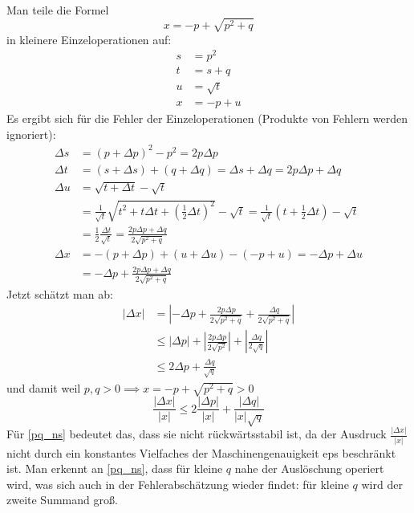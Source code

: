 \documentclass{mywork}
\begin{document}
\begin{aufgabe}
	\\Man teile die Formel
	\begin{equation}
		\label{pq_ns}
		x=-p+\sqrt{p^2+q}
	\end{equation} 
	in kleinere Einzeloperationen auf:
	\begin{align*}
		s&=p^2\\
		t&=s +q\\
		u&=\sqrt{t}\\
		x&=-p+u
	\end{align*}
	Es ergibt sich für die Fehler der Einzeloperationen (Produkte von Fehlern werden ignoriert):
	\begin{align*}
		\Delta s&=(p+\Delta p)^2-p^2=2p\Delta p\\
		\Delta t&=(s +\Delta s) + (q +\Delta q) = \Delta s + \Delta q = 2p\Delta p + \Delta q\\
		\Delta u&=\sqrt{t+\Delta t}-\sqrt{t}\\
			    &=\frac 1{\sqrt{t}}\sqrt{t^2+t\Delta t+\left(\frac 12\Delta t\right)^2}-\sqrt{t}
				 =\frac 1{\sqrt{t}}\left(t+\frac 12\Delta t\right)-\sqrt{t}\\
		   &=\frac 12\frac{\Delta t}{\sqrt{t}}
				 =\frac {2p\Delta p+\Delta q}{2\sqrt{p^2+q}}\\
		\Delta x&=-(p+\Delta p)+(u+\Delta u)-(-p+u)
				 =-\Delta p +\Delta u\\
				 &=-\Delta p +\frac {2p\Delta p+\Delta q}{2\sqrt{p^2+q}}
	\end{align*}
	Jetzt schätzt man ab:
	\begin{align*}
		|\Delta x|&=\left|-\Delta p+ \frac {2p\Delta p}{2\sqrt{p^2+q}}+\frac{\Delta q}{2\sqrt{p^2+q}}\right|\\
				   &\le |\Delta p|+\left|\frac{2p\Delta p}{2\sqrt{p^2}}\right|+\left|\frac{\Delta q}{2\sqrt{q}}\right|\\
				   &\le 2\Delta p + \frac {\Delta q}{\sqrt q}
	\end{align*}
	und damit weil $p,q>0 \implies x=-p+\sqrt{p^2+q}>0$
	\[
		\frac{|\Delta x|}{|x|}\le2\frac{|\Delta p|}{|x|}+\frac{|\Delta q|}{|x|\sqrt{q}}
	\]
	Für \eqref{pq_ns} bedeutet das, dass sie nicht rückwärtsstabil ist, da der Ausdruck
	$\frac {|\Delta x|}{|x|}$ nicht durch ein konstantes Vielfaches der Maschinengenauigkeit eps beschränkt ist.
	Man erkennt an \eqref{pq_ns}, dass für kleine $q$ nahe der Auslöschung operiert wird, was sich auch in der Fehlerabschätzung wieder findet: für kleine $q$ wird der zweite Summand groß.
	

\end{aufgabe}
\end{document}
